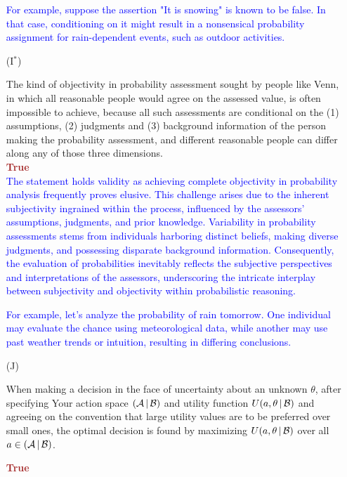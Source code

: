 \documentclass[12pt]{article}
\newcommand{\given}{\, | \,}
\begin{document}
\begin{itemize}
\textcolor{blue}{For example, suppose the assertion "It is snowing" is known to be false. In that case, conditioning on it might result in a nonsensical probability assignment for rain-dependent events, such as outdoor activities.}


\item[(I$^*$)]

The kind of objectivity in probability assessment sought by people like
Venn, in which all reasonable people would agree on the assessed value, is
often impossible to achieve, because all such assessments are conditional
on the (1) assumptions, (2) judgments and (3) background information of the
person making the probability assessment, and different reasonable people
can differ along any of those three dimensions.\\
\textcolor{brown}{\textbf{True}} \\
\textcolor{blue}{The statement holds validity as achieving complete objectivity in probability analysis frequently proves elusive. This challenge arises due to the inherent subjectivity ingrained within the process, influenced by the assessors' assumptions, judgments, and prior knowledge. Variability in probability assessments stems from individuals harboring distinct beliefs, making diverse judgments, and possessing disparate background information. Consequently, the evaluation of probabilities inevitably reflects the subjective perspectives and interpretations of the assessors, underscoring the intricate interplay between subjectivity and objectivity within probabilistic reasoning.}

\textcolor{blue}{For example, let's analyze the probability of rain tomorrow. One individual may evaluate the chance using meteorological data, while another may use past weather trends or intuition, resulting in differing conclusions.}


\item[(J)]

When making a decision in the face of uncertainty about an unknown $\theta$, after specifying Your action space $( { \cal A } \given { \cal B } )$ and utility function $U ( a, \theta \given { \cal B } )$ and agreeing on the convention that large utility values are to be preferred over small ones, the optimal decision is found by maximizing $U ( a, \theta \given { \cal B } )$ over all $a \in ( { \cal A } \given { \cal B } )$.

\textcolor{brown}{\textbf{True}}


\end{itemize}
\end{document}
